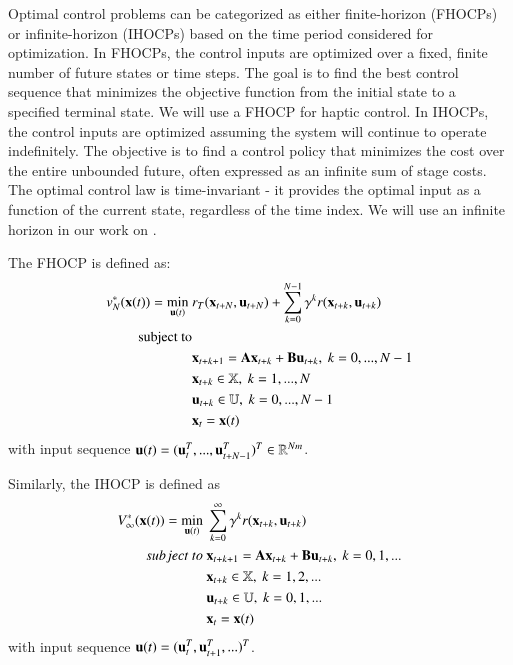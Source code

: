 Optimal control problems can be categorized as either finite-horizon (FHOCPs) or infinite-horizon (IHOCPs) based on the time period considered for optimization.
In FHOCPs, the control inputs are optimized over a fixed, finite number of future states or time steps. The goal is to find the best control sequence that minimizes the objective function from the initial state to a specified terminal state. We will use a FHOCP for haptic control.  
In IHOCPs, the control inputs are optimized assuming the system will continue to operate indefinitely. The objective is to find a control policy that minimizes the cost over the entire unbounded future, often expressed as an infinite sum of stage costs. The optimal control law is time-invariant - it provides the optimal input as a function of the current state, regardless of the time index. We will use an infinite horizon in our work on \marluiTitle. 

The FHOCP is defined as:
\begin{align}
\label{eq:finite_horizon}
    v_N^*(\mathbf{x}(t)) = \underset{\mathbf{u}(t)}{\min}~&r_T(\mathbf{x}_{t+N}, \mathbf{u}_{t+N}) + \sum^{N-1}_{k=0} \gamma^k r(\mathbf{x}_{t+k}, \mathbf{u}_{t+k}) \\ \nonumber
    \text{subject to} & \\ \nonumber
    &\mathbf{x}_{t+k+1} = \mathbf{Ax}_{t+k} + \mathbf{Bu}_{t+k},~k = 0,..., N - 1 \\ \nonumber
    &\mathbf{x}_{t+k} \in \mathbb{X},~k = 1,..., N  \\ \nonumber
    &\mathbf{u}_{t+k} \in \mathbb{U},~k = 0,..., N - 1  \\ \nonumber
    &\mathbf{x}_{t} = \mathbf{x}(t) \nonumber
\end{align}
with input sequence $\mathbf{u}(t) = (\mathbf{u}^{T}_t, ..., \mathbf{u}^{T}_{t+N-1})^T \in \mathbb{R}^{Nm}$.

Similarly, the IHOCP is defined as
\begin{align}
\label{eq:infinite_horizon}
    V_\infty^*(\mathbf{x}(t)) = \underset{\mathbf{u}(t)}{\min}~&\sum^{\infty}_{k=0} \gamma^k r(\mathbf{x}_{t+k}, \mathbf{u}_{t+k}) \\
    subject~to~ &\mathbf{x}_{t+k+1} = \mathbf{Ax}_{t+k} + \mathbf{Bu}_{t+k},~k = 0, 1,... \\ \nonumber
    &\mathbf{x}_{t+k} \in \mathbb{X},~k = 1, 2,...  \\ \nonumber
    &\mathbf{u}_{t+k} \in \mathbb{U},~k = 0, 1,... \\ \nonumber
    &\mathbf{x}_t = \mathbf{x}(t) \nonumber
\end{align}
with input sequence $\mathbf{u}(t) = (\mathbf{u}^{T}_t, \mathbf{u}^{T}_{t+1}, ...)^T$.

